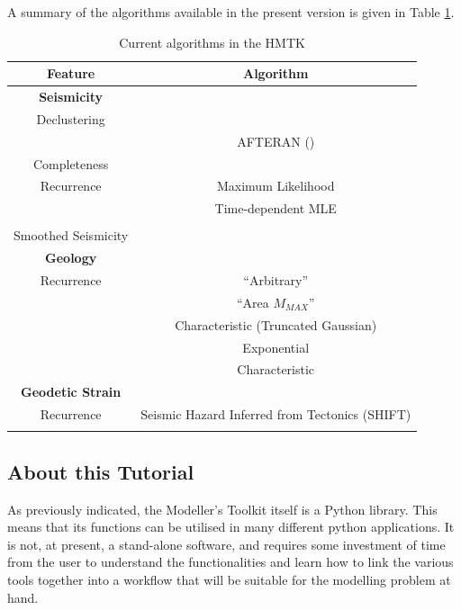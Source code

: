 A summary of the algorithms available in the present version is given in Table \ref{tab:current_features}.
\begin{table}
\centering
\begin{tabular}{|c|c|} \hline
\textbf{Feature} & \textbf{Algorithm}\\ \hline
\textbf{Seismicity} & \\ \hline
Declustering & \cite{GardnerKnopoff1974}  \\
    & AFTERAN (\cite{Musson1999}) \\ \hline
Completeness & \cite{Stepp1971}\\ \hline
Recurrence & Maximum Likelihood \cite{Aki1965}\\
 & Time-dependent MLE\\
 & \cite{Weichert1980}\\ \hline
 Smoothed Seismicity & \cite{frankel1995} \\ \hline
 \textbf{Geology} & \\ \hline
 Recurrence & \cite{AndersonLuco1983} ``Arbitrary''\\
  & \cite{AndersonLuco1983} ``Area $M_{MAX}$''\\
  & Characteristic (Truncated Gaussian) \\
  & \cite{YoungsCoppersmith1985} Exponential\\
  & \cite{YoungsCoppersmith1985} Characteristic\\ \hline
 \textbf{Geodetic Strain} & \\ \hline
 Recurrence & Seismic Hazard Inferred from Tectonics (SHIFT) \\
           &  \cite{BirdLiu2007, Bird_etal2010} \\ \hline
\end{tabular}
\caption{Current algorithms in the HMTK}
\label{tab:current_features}
\end{table}

\subsection{About this Tutorial}

As previously indicated, the Modeller's Toolkit itself is a Python library. This means that its functions can be utilised in many different python applications. It is not, at present, a stand-alone software, and requires some investment of time from the user to understand the functionalities and learn how to link the various tools together into a workflow that will be suitable for the modelling problem at hand.

